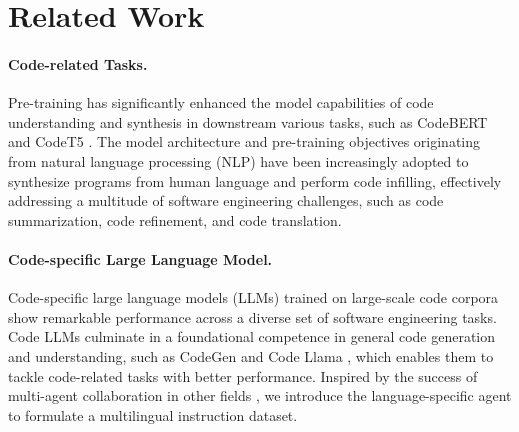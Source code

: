 \section{Related Work}
\paragraph{Code-related Tasks.}
Pre-training has significantly enhanced the model capabilities of code understanding and synthesis in downstream various tasks, such as CodeBERT \cite{CodeBERT} and CodeT5 \cite{CodeT5}. The model architecture and pre-training objectives originating from natural language processing (NLP) \cite{CodeXGLUE,CodeTransOcean,refine_gpt,chat_unitest} have been increasingly adopted to synthesize programs from human language and perform code infilling, effectively addressing a multitude of software engineering challenges, such as code summarization, code refinement, and code translation.

\paragraph{Code-specific Large Language Model.}
Code-specific large language models (LLMs) \cite{starcoder,code_llama,guo2024deepseekcoder,codearena,execrepobench} trained on large-scale code corpora show remarkable performance across a diverse set of software engineering tasks. Code LLMs culminate in a foundational competence in general code generation and understanding, such as CodeGen \cite{codegen} and Code Llama \cite{code_llama}, which enables them to tackle code-related tasks with better performance. Inspired by the success of multi-agent collaboration in other fields \cite{multi_agents_survey,autonomous_agents_survey}, we introduce the language-specific agent to formulate a multilingual instruction dataset. 

